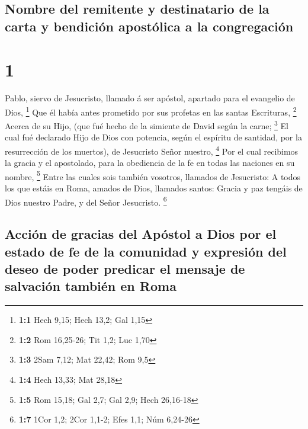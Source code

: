 \hypertarget{nombre-del-remitente-y-destinatario-de-la-carta-y-bendiciuxf3n-apostuxf3lica-a-la-congregaciuxf3n}{%
\subsection{Nombre del remitente y destinatario de la carta y bendición
apostólica a la
congregación}\label{nombre-del-remitente-y-destinatario-de-la-carta-y-bendiciuxf3n-apostuxf3lica-a-la-congregaciuxf3n}}

\hypertarget{section}{%
\section{1}\label{section}}

 Pablo, siervo de Jesucristo, llamado á ser apóstol,
apartado para el evangelio de Dios, \footnote{\textbf{1:1} Hech 9,15;
  Hech 13,2; Gal 1,15}  Que él había antes prometido por
sus profetas en las santas Escrituras, \footnote{\textbf{1:2} Rom
  16,25-26; Tit 1,2; Luc 1,70}  Acerca de su Hijo, (que
fué hecho de la simiente de David según la carne; \footnote{\textbf{1:3}
  2Sam 7,12; Mat 22,42; Rom 9,5}  El cual fué declarado
Hijo de Dios con potencia, según el espíritu de santidad, por la
resurrección de los muertos), de Jesucristo Señor nuestro, \footnote{\textbf{1:4}
  Hech 13,33; Mat 28,18}  Por el cual recibimos la gracia
y el apostolado, para la obediencia de la fe en todas las naciones en su
nombre, \footnote{\textbf{1:5} Rom 15,18; Gal 2,7; Gal 2,9; Hech
  26,16-18}  Entre las cuales sois también vosotros,
llamados de Jesucristo:  A todos los que estáis en Roma,
amados de Dios, llamados santos: Gracia y paz tengáis de Dios nuestro
Padre, y del Señor Jesucristo. \footnote{\textbf{1:7} 1Cor 1,2; 2Cor
  1,1-2; Efes 1,1; Núm 6,24-26}

\hypertarget{acciuxf3n-de-gracias-del-apuxf3stol-a-dios-por-el-estado-de-fe-de-la-comunidad-y-expresiuxf3n-del-deseo-de-poder-predicar-el-mensaje-de-salvaciuxf3n-tambiuxe9n-en-roma}{%
\subsection{Acción de gracias del Apóstol a Dios por el estado de fe de
la comunidad y expresión del deseo de poder predicar el mensaje de
salvación también en
Roma}\label{acciuxf3n-de-gracias-del-apuxf3stol-a-dios-por-el-estado-de-fe-de-la-comunidad-y-expresiuxf3n-del-deseo-de-poder-predicar-el-mensaje-de-salvaciuxf3n-tambiuxe9n-en-roma}}

